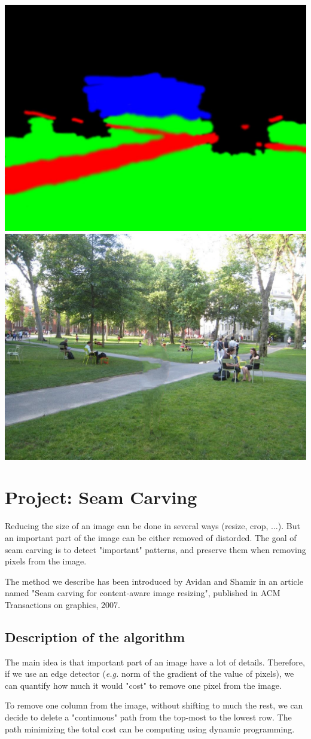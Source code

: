 \documentclass[a4paper]{article}
\begin{document}
  \begin{center}
  \includegraphics[width=.4\textwidth]{results_texture/2/768x1024_hint.png}
  \includegraphics[width=.4\textwidth]{results_texture/2/768x1024_output.png}
  \end{center}
  
  \newpage
  
  \section{Project: Seam Carving}
  
  Reducing the size of an image can be done in several ways (resize, crop, ...). But an important part of the image can be either removed of distorded. The goal of seam carving is to detect "important" patterns, and preserve them when removing pixels from the image.
  
  \medskip The method we describe has been introduced by Avidan and Shamir in an article named "Seam carving for content-aware image resizing", published in ACM Transactions on graphics, 2007.
  
  \subsection{Description of the algorithm}
  
  The main idea is that important part of an image have a lot of details. Therefore, if we use an edge detector (\textit{e.g.} norm of the gradient of the value of pixels), we can quantify how much it would "cost" to remove one pixel from the image.
  
  To remove one column from the image, without shifting to much the rest, we can decide to delete a "continuous" path from the top-most to the lowest row. The path minimizing the total cost can be computing using dynamic programming.
  
\end{document}
